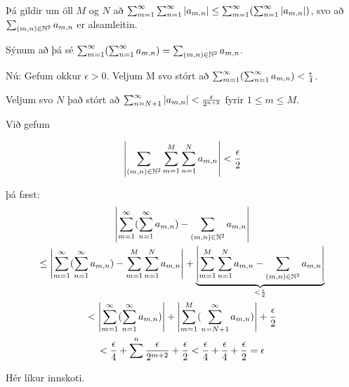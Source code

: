 \documentclass[12pt]{book} \usepackage[utf8]{inputenc}
\begin{document}
{

  \def\mn{(m,n)} \def\amn{a_{m,n}} \def\summn{\sum_{\mn \in \N^2}}

  Þá gildir um öll $M$ og $N$ að
  $\sum_{m=1}^{\infty} \sum_{n=1}^{\infty} \abs{\amn} \leq \summinfty
  (\sumoinfty \abs{\amn})$,
  svo að $\sum_{\mn \in \N^2} \amn$ er alsamleitin.

  Sýnum að þá sé $\summinfty ( \sumoinfty \amn ) = \summn \amn$.

  Nú: Gefum okkur $\epsilon > 0$. Veljum M svo stórt að
  $\summinfty ( \sumoinfty \amn ) < \eps{4}$.

  Veljum svo $N$ það stórt að
  $\sum_{n = N+1}^{\infty} \abs{\amn} < \eps{2^{n+2}}$ fyrir
  $1 \leq m \leq M$.


  Við gefum

  \[\abs{\sum_{(m,n) \in \N^2} \sum_{m=1}^M \sum_{n=1}^N \amn } <
  \eps{2} \]

  þá fæst:
  \begin{gather*}
    \abs{\summinfty ( \sumoinfty \amn) - \sum_{(m,n) \in \N^2} \amn}\\
    \leq \abs{\summinfty ( \sumoinfty \amn) - \sum_{m=1}^{M} \sum_{n=1}^N \amn}
    + \underbrace{\abs{\sum_{m=1}^M \sum_{n=1}^N \amn - \sum_{(m,n) \in \N^2} \amn}}_{< \eps{2}}\\
    < \abs{\summinfty ( \sumoinfty \amn)} + \abs{\sum_{m=1}^M ( \sum_{n = N+1}^{\infty} \amn)} + \eps{2}\\
    < \eps{4} + \sum^n \eps{2^{m+2}} + \eps{2} < \eps{4} + \eps{4} +
    \eps{2} = \epsilon
  \end{gather*}

  Hér líkur innskoti.

}

\section{}
\end{document}
